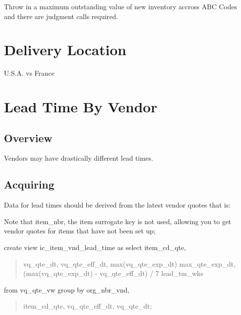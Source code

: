 \documentclass[letterpaper,10pt,english]{sphinxmanual}
\begin{document}
Throw in a maximum outstanding value of new inventory accross ABC Codes and there are judgment calls required.


\chapter{Delivery Location}
\label{\detokenize{DeliveryLocation:delivery-location}}\label{\detokenize{DeliveryLocation::doc}}
U.S.A. vs France


\chapter{Lead Time By Vendor}
\label{\detokenize{LeadTimeByVendor:lead-time-by-vendor}}\label{\detokenize{LeadTimeByVendor::doc}}

\section{Overview}
\label{\detokenize{LeadTimeByVendor:overview}}
Vendors may have drastically different lead times.


\section{Acquiring}
\label{\detokenize{LeadTimeByVendor:acquiring}}
Data for lead times should be derived from the latest vendor quotes that is:

Note that item\_nbr, the item surrogate key is not used, allowing you to
get vendor quotes for items that have not been set up;

create view ic\_item\_vnd\_lead\_time as
select  item\_cd\_qte,
\begin{quote}

vq\_qte\_dt,
vq\_qte\_eff\_dt,
max(vq\_qte\_exp\_dt) max\_qte\_exp\_dt,
(max(vq\_qte\_exp\_dt) - vq\_qte\_eff\_dt) / 7 lead\_tm\_wks
\end{quote}

from vq\_qte\_vw
group by org\_nbr\_vnd,
\begin{quote}

item\_cd\_qte,
vq\_qte\_eff\_dt,
vq\_qte\_dt;
\end{quote}
\end{document}
